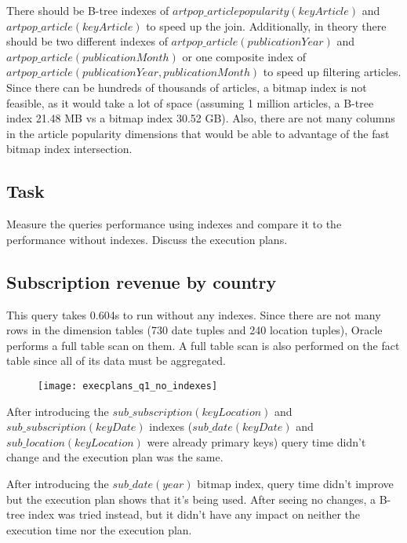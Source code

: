 There should be B-tree indexes of $artpop\_articlepopularity(keyArticle)$ and \\ 
$artpop\_article(keyArticle)$ to speed up the join. 
Additionally, in theory there should be two different indexes of $artpop\_article(publicationYear)$ and\\
$artpop\_article(publicationMonth)$ or one composite index of $artpop\_article(publicationYear, publicationMonth)$ to speed up filtering articles. Since there can be hundreds of thousands of articles, a bitmap index is not feasible, as it would take a lot of space (assuming 1 million articles, a B-tree index 21.48 MB vs a bitmap index 30.52 GB). Also, there are not many columns in the article popularity dimensions that would be able to advantage of the fast bitmap index intersection.

\subsection*{Task} 
Measure the queries performance using indexes and compare it to the
performance without indexes. Discuss the execution plans.

\subsection*{Subscription revenue by country} 
This query takes 0.604s to run without any indexes. Since there are not many rows in the dimension tables (730 date tuples and 240 location tuples), Oracle performs a full table scan on them. A full table scan is also performed on the fact table since all of its data must be aggregated.

\begin{figure}[!htp]
\begin{center}
  \texttt{[image: execplans\_q1\_no\_indexes]}
\end{center}
\end{figure}

After introducing the $sub\_subscription(keyLocation)$ and $sub\_subscription(keyDate)$ indexes ($sub\_date(keyDate)$ and $sub\_location(keyLocation)$ were already primary keys) query time didn't change and the execution plan was the same.

After introducing the $sub\_date(year)$ bitmap index, query time didn't improve but the execution plan shows that it's being used. After seeing no changes, a B-tree index was tried instead, but it didn't have any impact on neither the execution time nor the execution plan.

